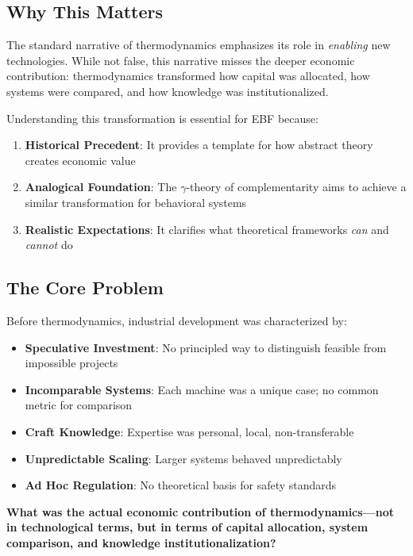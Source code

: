 \subsection{Why This Matters}

The standard narrative of thermodynamics emphasizes its role in \textit{enabling}
new technologies. While not false, this narrative misses the deeper economic
contribution: thermodynamics transformed how capital was allocated, how systems
were compared, and how knowledge was institutionalized.

Understanding this transformation is essential for EBF because:

\begin{enumerate}
    \item \textbf{Historical Precedent}: It provides a template for how abstract
    theory creates economic value
    \item \textbf{Analogical Foundation}: The $\gamma$-theory of complementarity
    aims to achieve a similar transformation for behavioral systems
    \item \textbf{Realistic Expectations}: It clarifies what theoretical frameworks
    \textit{can} and \textit{cannot} do
\end{enumerate}

\subsection{The Core Problem}

Before thermodynamics, industrial development was characterized by:

\begin{itemize}
    \item \textbf{Speculative Investment}: No principled way to distinguish
    feasible from impossible projects
    \item \textbf{Incomparable Systems}: Each machine was a unique case;
    no common metric for comparison
    \item \textbf{Craft Knowledge}: Expertise was personal, local, non-transferable
    \item \textbf{Unpredictable Scaling}: Larger systems behaved unpredictably
    \item \textbf{Ad Hoc Regulation}: No theoretical basis for safety standards
\end{itemize}

\begin{tcolorbox}[colback=red!5!white, colframe=red!75!black,
    title=The Fundamental Question]
\textbf{What was the actual economic contribution of thermodynamics---not in
technological terms, but in terms of capital allocation, system comparison,
and knowledge institutionalization?}
\end{tcolorbox}


